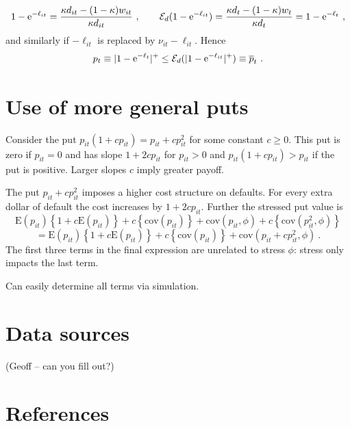 \documentclass[authoryear]{elsarticle}
\newcommand{\E}{\mathrm{E}}
\newcommand{\e}{\mathrm{e}}
\newcommand{\cov}{\mathrm{cov}}
\newcommand{\Ex}{{\cal E}}
\newcommand{\cq}{\ , \qquad}
\begin{document}
$$
1-\e^{-\ell_{it}} = \frac{ \kappa d_{it} - (1-\kappa)w_{it}}{\kappa d_{it}}\cq \Ex_d (1-\e^{-\ell_{it}}) = \frac{\kappa d_t - (1-\kappa) w_t}{\kappa d_t} = 1-\e^{-\ell_t} \ ,
$$
and similarly if $-\ell_{it}$ is replaced by $\nu_{it}-\ell_{it}$.   Hence 
$$
p_t\equiv |1-\e^{-\ell_t}|^+ \le \Ex_d (|1-\e^{-\ell_{it}}|^+)\equiv \overline p_t\ . 
$$ 

\section{Use of more general puts}

Consider the put $p_{it}(1+cp_{it})=p_{it}+cp_{it}^2 $ for some constant $c\ge 0$.   This put is zero if $p_{it}=0$ and has slope $1+2cp_{it}$ for $p_{it}>0$ and $p_{it}(1+cp_{it})>p_{it}$ if the put is positive.  Larger slopes $c$ imply greater payoff.  

The put $p_{it}+cp_{it}^2$ imposes a higher cost structure on defaults.    For every extra dollar of default the cost increases by $1+2cp_{it}$.   Further the stressed put value is
$$
\E(p_{it})\left\{1+c\E(p_{it})\right\} +c\left\{\cov(p_{it})\right\}+ \cov(p_{it},\phi) + c\left\{\cov(p^2_{it},\phi)\right\}
$$
$$
=\E(p_{it})\left\{1+c\E(p_{it})\right\} +c\left\{\cov(p_{it})\right\}+ \cov(p_{it}+cp^2_{it},\phi)\ .
$$
The first three terms in the final expression are unrelated to stress $\phi$: stress only impacts the last term. 

Can easily determine all terms via simulation.


\section{Data sources}\label{data}

(Geoff -- can you fill out?)



\section*{References}

\end{document}

